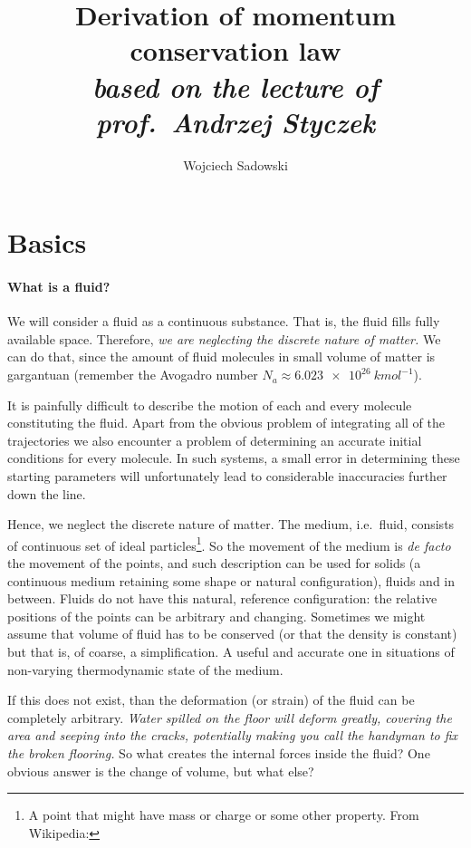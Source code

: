 \documentclass{article}
\title{Derivation of momentum conservation law\\
\large \textit{based on the lecture of prof.\ Andrzej Styczek}}
\author{Wojciech Sadowski}
\begin{document}
\maketitle

\section{Basics}

\paragraph{What is a fluid?}
We will consider a fluid as a continuous substance. That is, the fluid fills
fully available space. Therefore, \emph{we are neglecting the discrete nature
of matter.} We can do that, since the amount of fluid molecules in small volume 
of matter is gargantuan (remember the Avogadro number \(N_a\approx\SI{6.023e26}{kmol^{-1}}\)).

It is painfully difficult to describe the motion of each and every molecule 
constituting the fluid. Apart from the obvious problem of integrating all of 
the trajectories we also encounter a problem of determining an accurate initial
conditions for every molecule. In such systems, a small error in determining 
these starting parameters will unfortunately lead to considerable inaccuracies
further down the line.

Hence, we neglect the discrete nature of matter. The medium, i.e.\ fluid, consists 
of continuous set of ideal particles\footnote{%
A point that might have mass or charge or some other 
property. From Wikipedia: }.
So the movement of the medium is 
\emph{de facto} the movement of the points, and such description can be 
used for solids (a continuous medium retaining some shape or natural configuration),
fluids and  in between. Fluids do not have this natural, reference 
configuration: the relative positions of the points can be arbitrary and changing.
Sometimes we might assume that volume of fluid has to be conserved (or that the 
density is constant) but that is, of coarse, a simplification. A useful and 
accurate one in situations of non-varying thermodynamic state of the medium.

If this  does not exist, than the deformation (or strain) of the fluid
can be completely arbitrary. \emph{Water spilled on the floor will deform greatly,
covering the area and seeping into the cracks, potentially making you call the 
handyman to fix the broken flooring.} So what creates the internal forces inside 
the fluid? One obvious answer is the change of volume, but what else?
\end{document}
